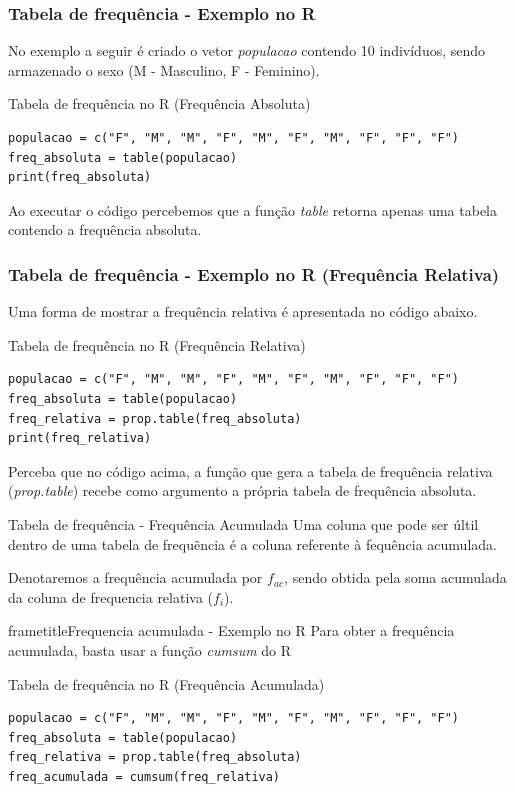 \begin{frame}[fragile]
\frametitle{Tabela de frequência - Exemplo no R}
No exemplo a seguir é criado o vetor \textit{populacao} contendo 10 indivíduos, sendo armazenado o sexo (M - Masculino, F - Feminino).
\begin{block}{Tabela de frequência no R (Frequência Absoluta)}
\begin{verbatim}
populacao = c("F", "M", "M", "F", "M", "F", "M", "F", "F", "F")
freq_absoluta = table(populacao)
print(freq_absoluta)
\end{verbatim}
\end{block}
\pause
Ao executar o código percebemos que a função \textit{table} retorna apenas uma tabela contendo a frequência absoluta.  
\end{frame}

\begin{frame}[fragile]
\frametitle{Tabela de frequência - Exemplo no R (Frequência Relativa)}
Uma forma de mostrar a frequência relativa é apresentada no código abaixo. 
\begin{block}{Tabela de frequência no R (Frequência Relativa)}
\begin{verbatim}
populacao = c("F", "M", "M", "F", "M", "F", "M", "F", "F", "F")
freq_absoluta = table(populacao)
freq_relativa = prop.table(freq_absoluta)
print(freq_relativa)
\end{verbatim}
\end{block} 
\pause
\begin{atencao}
    Perceba que no código acima, a função que gera a tabela de frequência relativa (\textit{prop.table}) recebe como argumento a própria tabela de frequência absoluta. 
\end{atencao}

\end{frame}

\begin{frame}{Tabela de frequência - Frequência Acumulada}
    Uma coluna que pode ser últil dentro de uma tabela de frequẽncia é a coluna referente à fequência acumulada. 

    Denotaremos a frequência acumulada por $f_{ac}$, sendo obtida pela soma acumulada da coluna de frequencia relativa ($f_i$).
\end{frame}

\begin{frame}[fragile]
frametitle{Frequencia acumulada - Exemplo no R}
Para obter a frequência acumulada, basta usar a função \textit{cumsum} do R
\begin{block}{Tabela de frequência no R (Frequência Acumulada)}
\begin{verbatim}
populacao = c("F", "M", "M", "F", "M", "F", "M", "F", "F", "F")
freq_absoluta = table(populacao)
freq_relativa = prop.table(freq_absoluta)
freq_acumulada = cumsum(freq_relativa)
\end{verbatim}
\end{block}   
    
\end{frame}

